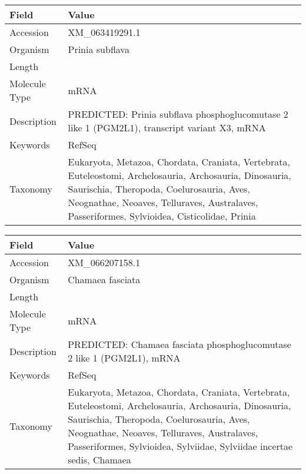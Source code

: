 \documentclass[10pt]{article}
\begin{document}
\vspace{1em}
{\footnotesize
\begin{longtable}{>{\raggedright\arraybackslash}p{4.5cm} >{\raggedright\arraybackslash}p{11.5cm}}
\textbf{Field} & \textbf{Value} \\
\hline
Accession & XM\_063419291.1 \\
Organism & Prinia subflava \\
Length & 5995 \\
Molecule Type & mRNA \\
Description & PREDICTED: Prinia subflava phosphoglucomutase 2 like 1 (PGM2L1), transcript variant X3, mRNA \\
Keywords & RefSeq \\
Taxonomy & Eukaryota, Metazoa, Chordata, Craniata, Vertebrata, Euteleostomi, Archelosauria, Archosauria, Dinosauria, Saurischia, Theropoda, Coelurosauria, Aves, Neognathae, Neoaves, Telluraves, Australaves, Passeriformes, Sylvioidea, Cisticolidae, Prinia \\
\end{longtable}
}

\vspace{1em}
{\footnotesize
\begin{longtable}{>{\raggedright\arraybackslash}p{4.5cm} >{\raggedright\arraybackslash}p{11.5cm}}
\textbf{Field} & \textbf{Value} \\
\hline
Accession & XM\_066207158.1 \\
Organism & Chamaea fasciata \\
Length & 5985 \\
Molecule Type & mRNA \\
Description & PREDICTED: Chamaea fasciata phosphoglucomutase 2 like 1 (PGM2L1), mRNA \\
Keywords & RefSeq \\
Taxonomy & Eukaryota, Metazoa, Chordata, Craniata, Vertebrata, Euteleostomi, Archelosauria, Archosauria, Dinosauria, Saurischia, Theropoda, Coelurosauria, Aves, Neognathae, Neoaves, Telluraves, Australaves, Passeriformes, Sylvioidea, Sylviidae, Sylviidae incertae sedis, Chamaea \\
\end{longtable}
}
\end{document}
